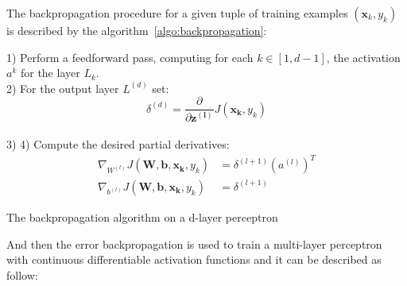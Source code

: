 \documentclass[a4paper,11pt]{report}
\begin{document}
 		The backpropagation procedure for a given tuple of training examples $(\mathbf{x}_{k},y_{k})$  is described by the algorithm~\ref{algo:backpropagation}:\\
		
		\begin{center}
			\begin{algorithm}[H]
				1) Perform a feedforward pass, computing for each $k \in [1, d-1]$, the activation $a^{k}$ for the layer $L_{k}$.\\
				2) For the output layer $L^{(d)}$ set: \\
				\begin{equation}
					\delta^{(d)} = \frac{\partial }{\partial \mathbf{z^{(l)}}} J(\mathbf{x_{k}},y_{k})
					\label{eq:last layer error for backpropagation}
				\end{equation}\\
				3)
				4) Compute the desired partial derivatives:
					\begin{subequations}
						\label{eq:backpropagation}
						\begin{align}
							\nabla_{W^{(l)}} J(\mathbf{W},\mathbf{b},\mathbf{x_{k}},y_{k}) & = \delta^{(l+1)}(a^{(l)})^{T} \\
							\nabla_{b^{(l)}} J(\mathbf{W},\mathbf{b},\mathbf{x_{k}},y_{k}) & = \delta^{(l+1)}
						\end{align}
					\end{subequations}
				\caption{The backpropagation algorithm on a d-layer perceptron}
				\label{algo:backpropagation}		
			\end{algorithm}        
		\end{center}
		
		And then the error backpropagation is used to train a multi-layer perceptron with continuous differentiable activation functions and it can be described as follow:\\
		
\end{document}
